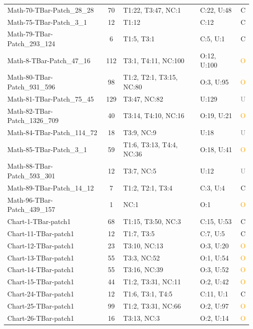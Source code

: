\begin{longtable}{l|c|l|l|c}
Math-70-TBar-Patch\_28\_28 & 70 & T1:22, T3:47, NC:1 & C:22, U:48 & \textcolor{green!60!black}{C} \\
Math-75-TBar-Patch\_3\_1 & 12 & T1:12 & C:12 & \textcolor{green!60!black}{C} \\
Math-79-TBar-Patch\_293\_124 & 6 & T1:5, T3:1 & C:5, U:1 & \textcolor{green!60!black}{C} \\
Math-8-TBar-Patch\_47\_16 & 112 & T3:1, T4:11, NC:100 & O:12, U:100 & \textcolor{orange}{O} \\
Math-80-TBar-Patch\_931\_596 & 98 & T1:2, T2:1, T3:15, NC:80 & O:3, U:95 & \textcolor{orange}{O} \\
Math-81-TBar-Patch\_75\_45 & 129 & T3:47, NC:82 & U:129 & \textcolor{gray}{U} \\
Math-82-TBar-Patch\_1326\_709 & 40 & T3:14, T4:10, NC:16 & O:19, U:21 & \textcolor{orange}{O} \\
Math-84-TBar-Patch\_114\_72 & 18 & T3:9, NC:9 & U:18 & \textcolor{gray}{U} \\
Math-85-TBar-Patch\_3\_1 & 59 & T1:6, T3:13, T4:4, NC:36 & O:18, U:41 & \textcolor{orange}{O} \\
Math-88-TBar-Patch\_593\_301 & 12 & T3:7, NC:5 & U:12 & \textcolor{gray}{U} \\
Math-89-TBar-Patch\_14\_12 & 7 & T1:2, T2:1, T3:4 & C:3, U:4 & \textcolor{green!60!black}{C} \\
Math-96-TBar-Patch\_439\_157 & 1 & NC:1 & O:1 & \textcolor{orange}{O} \\
Chart-1-TBar-patch1 & 68 & T1:15, T3:50, NC:3 & C:15, U:53 & \textcolor{green!60!black}{C} \\
Chart-11-TBar-patch1 & 12 & T1:7, T3:5 & C:7, U:5 & \textcolor{green!60!black}{C} \\
Chart-12-TBar-patch1 & 23 & T3:10, NC:13 & O:3, U:20 & \textcolor{orange}{O} \\
Chart-13-TBar-patch1 & 55 & T3:3, NC:52 & O:1, U:54 & \textcolor{orange}{O} \\
Chart-14-TBar-patch1 & 55 & T3:16, NC:39 & O:3, U:52 & \textcolor{orange}{O} \\
Chart-15-TBar-patch1 & 44 & T1:2, T3:31, NC:11 & O:2, U:42 & \textcolor{orange}{O} \\
Chart-24-TBar-patch1 & 12 & T1:6, T3:1, T4:5 & C:11, U:1 & \textcolor{green!60!black}{C} \\
Chart-25-TBar-patch1 & 99 & T1:2, T3:31, NC:66 & O:2, U:97 & \textcolor{orange}{O} \\
Chart-26-TBar-patch1 & 16 & T3:13, NC:3 & O:2, U:14 & \textcolor{orange}{O} \\

\end{longtable}
